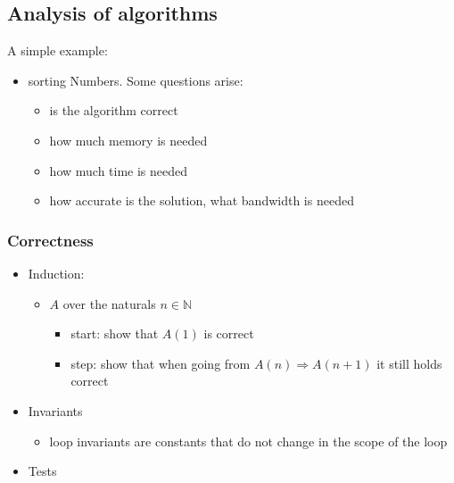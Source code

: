 \documentclass[a4paper]{article}
\begin{document}
\subsection{Analysis of algorithms}
A simple example:
\begin{itemize}
    \item sorting Numbers. Some questions arise:
        \begin{itemize}
            \item is the algorithm correct
            \item how much memory is needed
            \item how much time is needed
            \item how accurate is the solution, what bandwidth is needed
        \end{itemize}
\end{itemize}

\subsubsection{Correctness}
\begin{itemize}
    \item Induction:
        \begin{itemize}
            \item $ A $ over the naturals $ n \in \mathbb{N}$ %
                \begin{itemize}
                    \item start: show that $ A(1) $ is correct
                    \item step: show that when going from $ A(n) \Rightarrow A(n +1) $ it still holds correct
                \end{itemize}
        \end{itemize}
    \item Invariants
        \begin{itemize}
            \item loop invariants are constants that do not change in the scope of the loop
        \end{itemize}
    \item Tests
\end{itemize}
\end{document}

